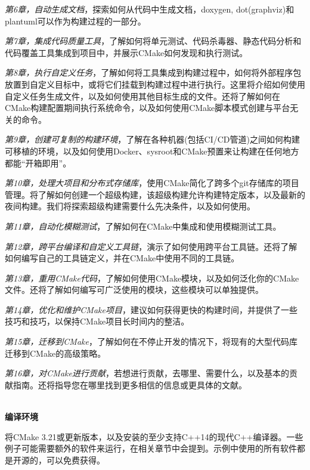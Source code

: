 \textit{第6章，自动生成文档}，探索如何从代码中生成文档，doxygen, dot(graphviz)和plantuml可以作为构建过程的一部分。

\textit{第7章，集成代码质量工具}，了解如何将单元测试、代码杀毒器、静态代码分析和代码覆盖工具集成到项目中，并展示CMake如何发现和执行测试。

\textit{第8章，执行自定义任务}，了解如何将工具集成到构建过程中，如何将外部程序包放置到自定义目标中，或将它们挂载到构建过程中进行执行。这里将介绍如何使用自定义任务生成文件，以及如何使用其他目标生成的文件。还将了解如何在CMake构建配置期间执行系统命令，以及如何使用CMake脚本模式创建与平台无关的命令。

\textit{第9章，创建可复制的构建环境}，了解在各种机器(包括CI/CD管道)之间如何构建可移植的环境，以及如何使用Docker、sysroot和CMake预置来让构建在任何地方都能“开箱即用”。

\textit{第10章，处理大项目和分布式存储库}，使用CMake简化了跨多个git存储库的项目管理。将了解如何创建一个超级构建，该超级构建允许构建特定版本，以及最新的夜间构建。我们将探索超级构建需要什么先决条件，以及如何使用。

\textit{第11章，自动化模糊测试}，了解如何在CMake中集成和使用模糊测试工具。

\textit{第12章，跨平台编译和自定义工具链}，演示了如何使用跨平台工具链。还将了解如何编写自己的工具链定义，并在CMake中使用不同的工具链。

\textit{第13章，重用CMake代码}，了解如何使用CMake模块，以及如何泛化你的CMake文件。还将了解如何编写可广泛使用的模块，这些模块可以单独提供。

\textit{第14章，优化和维护CMake项目}，建议如何获得更快的构建时间，并提供了一些技巧和技巧，以保持CMake项目长时间内的整洁。 

\textit{第15章，迁移到CMake}，了解如何在不停止开发的情况下，将现有的大型代码库迁移到CMake的高级策略。

\textit{第16章，对CMake进行贡献}，若想进行贡献，去哪里、需要什么，以及基本的贡献指南。还将指导您在哪里找到更多相信的信息或更具体的文献。

\hspace*{\fill} \\ %
\textbf{编译环境}

将CMake 3.21或更新版本，以及安装的至少支持C++14的现代C++编译器。一些例子可能需要额外的软件来运行，在相关章节中会提到。示例中使用的所有软件都是开源的，可以免费获得。

